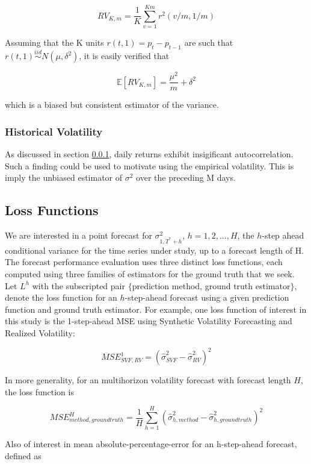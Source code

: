 \documentclass[11pt]{article}
\newcommand{\simiid}{\stackrel{iid}{\sim}} %
\def\E{\mathbb{E}} %
\theoremstyle{definition}
\begin{document}
    $$RV_{K,m} = \frac{1}{K}\sum^{Km}_{v=1}r^{2}(v/m,1/m)$$
    
    Assuming that the K units $r(t, 1) = p_{t} - p_{t-1}$ are such that $r(t, 1) \simiid N(\mu, \delta^{2})$, it is easily verified that 
    
    $$\E[RV_{K,m}] = \frac{\mu^{2}}{m} + \delta^{2}$$
    
    which is a biased but consistent estimator of the variance.
    
    \subsubsection{Historical Volatility}\label{historical_volatility}
    
    As discussed in section \ref{historical_volatility}, daily returns exhibit insigificant autocorrelation.  Such a finding could be used to motivate using the empirical volatility.  This is imply the unbiased estimator of $\sigma^{2}$ over the preceding M days.

\subsection{Loss Functions}

We are interested in a point forecast for $\sigma^{2}_{1,T^{*}+h}$, $h=1,2,...,H$, the $h$-step ahead conditional variance for the time series under study, up to a forecast length of H.  The forecast performance evaluation uses three distinct loss functions, each computed using three families of estimators for the ground truth that we seek.  Let $L^{h}$ with the subscripted pair $\{$prediction method, ground truth estimator$\}$, denote the loss function for an $h$-step-ahead forecast using a given prediction function and ground truth estimator.  For example, one loss function of interest in this study is the 1-step-ahead MSE using Synthetic Volatility Forecasting and Realized Volatility:

$$ MSE^{1}_{SVF, RV} = (\hat\sigma^{2}_{SVF} - \hat\sigma^{2}_{RV})^{2}$$

In more generality, for an multihorizon volatility forecast with forecast length $H$, the loss function is 

$$ MSE^{H}_{method, ground truth} = \frac{1}{H}\sum_{h=1}^{H}(\hat\sigma^{2}_{h, method} - \hat\sigma^{2}_{h, ground truth})^{2}$$

Also of interest in mean absolute-percentage-error for an h-step-ahead forecast, defined as
\end{document}
